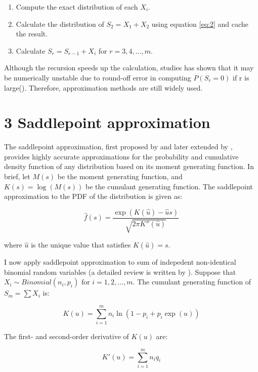 \begin{enumerate}
	\item Compute the exact distribution of each $X_i$.
	\item Calculate the distribution of $S_2=X_1+X_2$ using equation \ref{eq:2} and cache the result. 
	\item Calculate $S_r = S_{r-1} + X_i$ for $r = 3,4,...,m$.
\end{enumerate}

Although the recursion speeds up the calculation, studies has shown that it may be numerically unstable due to round-off error in computing $P(S_r=0)$ if r is large(\cite{Yili:al1vGrvv,Eisinga:2013da}). Therefore, approximation methods are still widely used.  

\section{3 Saddlepoint approximation}

The saddlepoint approximation, first proposed by \cite{Daniels:1954hy} and later extended by \cite{Lugannani:1980jm}, provides highly accurate approximations for the probability and cumulative density function of any distribution based on its moment generating function. In brief, let $M(s)$ be the moment generating function, and $K(s) = \log(M(s))$ be the cumulant generating function. The saddlepoint approximation to the PDF of the distribution is given as: 

\begin{equation}
\hat{f}(s)=\frac{\exp(K(\hat{u}) - \hat{u} s)}{\sqrt{2 \pi K''(\hat{u})}}
\end{equation}

where $\hat{u}$ is the unique value that satisfies $K(\hat{u})=s$. 


I now apply saddlepoint approximation to sum of indepedent non-identical binomial random variables (a detailed review is written by \cite{Eisinga:2013da}). Suppose that $X_i \sim Binomial(n_i, p_i) \text{ for } i = 1,2,...,m$. The cumulant generating function of $S_m = \sum X_i$ is:

\begin{equation}
K(u) = \sum_{i=1}^m n_i \ln (1-p_i + p_i \exp(u))
\end{equation}

The first- and second-order derivative of $K(u)$ are:

\begin{equation}
K'(u) = \sum_{i=1}^m n_i q_i
\end{equation}

